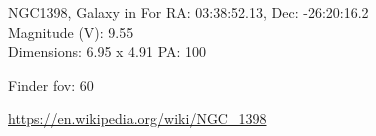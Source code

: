 \begin{block}{NGC1398, Galaxy in For}
    RA: 03:38:52.13, Dec: -26:20:16.2 \\ 
    Magnitude (V): 9.55 \\ 
    Dimensions: 6.95 x 4.91 PA: 100 

    Finder fov: 60 

    \url{https://en.wikipedia.org/wiki/NGC_1398} 
\end{block}